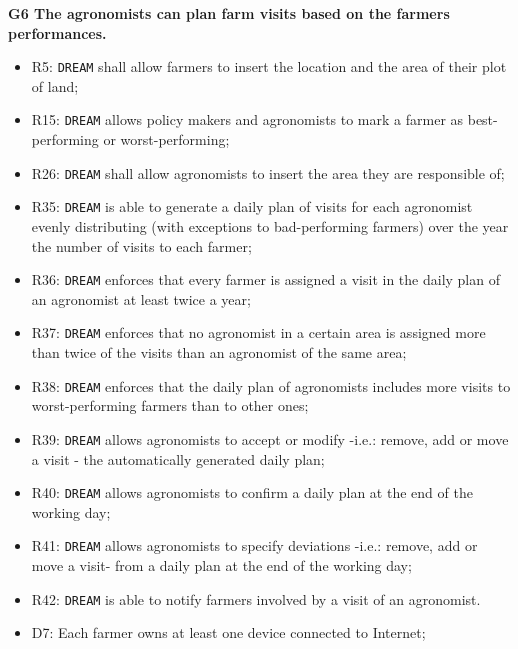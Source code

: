 \documentclass{article}
\begin{document}
\vspace{5mm}
\textbf{G6 The agronomists can plan farm visits based on the farmers performances.}
\begin{itemize}
    \item R5: \verb|DREAM| shall allow farmers to insert the location and the area of their plot of land;
    
    \item R15: \verb|DREAM| allows policy makers and agronomists to mark a farmer as best-performing or worst-performing;
    
    \item R26: \verb|DREAM| shall allow agronomists to insert the area they are responsible of;
    
    \item R35: \verb|DREAM| is able to generate a daily plan of visits for each agronomist evenly distributing (with exceptions to bad-performing farmers) over the year the number of visits to each farmer;

    \item R36: \verb|DREAM| enforces that every farmer is assigned a visit in the daily plan of an agronomist at least twice a year;

    \item R37: \verb|DREAM| enforces that no agronomist in a certain area is assigned more than twice of the visits than an agronomist of the same area;

    \item R38: \verb|DREAM| enforces that the daily plan of agronomists includes more visits to worst-performing farmers than to other ones;

    \item R39: \verb|DREAM| allows agronomists to accept or modify -i.e.: remove, add or move a visit - the automatically generated daily plan;

    \item R40: \verb|DREAM| allows agronomists to confirm a daily plan at the end of the working day; 

    \item R41: \verb|DREAM| allows agronomists to specify deviations -i.e.: remove, add or move a visit- from a daily plan at the end of the working day; 

    \item R42: \verb|DREAM| is able to notify farmers involved by a visit of an agronomist.
    
    \item D7: Each farmer owns at least one device connected to Internet;
    

\end{itemize}
\end{document}

